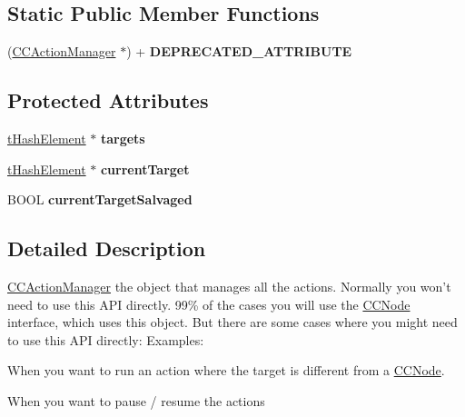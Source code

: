 \subsection*{Static Public Member Functions}
\begin{DoxyCompactItemize}
\item 
\hypertarget{interface_c_c_action_manager_aa59391b28d619b1cc9c8c8013839f776}{(\hyperlink{interface_c_c_action_manager}{C\-C\-Action\-Manager} $\ast$) + {\bfseries D\-E\-P\-R\-E\-C\-A\-T\-E\-D\-\_\-\-A\-T\-T\-R\-I\-B\-U\-T\-E}}\label{interface_c_c_action_manager_aa59391b28d619b1cc9c8c8013839f776}

\end{DoxyCompactItemize}
\subsection*{Protected Attributes}
\begin{DoxyCompactItemize}
\item 
\hypertarget{interface_c_c_action_manager_a24bbe7c5c87bf4cfee6b8f48b5078d6b}{\hyperlink{struct__hash_element}{t\-Hash\-Element} $\ast$ {\bfseries targets}}\label{interface_c_c_action_manager_a24bbe7c5c87bf4cfee6b8f48b5078d6b}

\item 
\hypertarget{interface_c_c_action_manager_a863f13a4c8bae7d26a0524dd18a1cfd3}{\hyperlink{struct__hash_element}{t\-Hash\-Element} $\ast$ {\bfseries current\-Target}}\label{interface_c_c_action_manager_a863f13a4c8bae7d26a0524dd18a1cfd3}

\item 
\hypertarget{interface_c_c_action_manager_add665102da7e76098785b6078f3bade7}{B\-O\-O\-L {\bfseries current\-Target\-Salvaged}}\label{interface_c_c_action_manager_add665102da7e76098785b6078f3bade7}

\end{DoxyCompactItemize}


\subsection{Detailed Description}
\hyperlink{interface_c_c_action_manager}{C\-C\-Action\-Manager} the object that manages all the actions. Normally you won't need to use this A\-P\-I directly. 99\% of the cases you will use the \hyperlink{class_c_c_node}{C\-C\-Node} interface, which uses this object. But there are some cases where you might need to use this A\-P\-I directly\-: Examples\-:
\begin{DoxyItemize}
\item When you want to run an action where the target is different from a \hyperlink{class_c_c_node}{C\-C\-Node}.
\item When you want to pause / resume the actions
\end{DoxyItemize}

